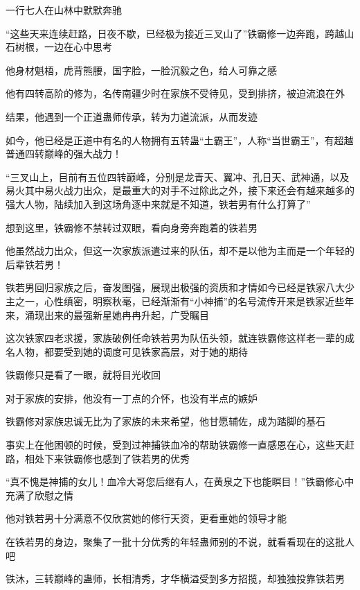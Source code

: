 
\begin{this_body}



一行七人在山林中默默奔驰

“这些天来连续赶路，日夜不歇，已经极为接近三叉山了”铁霸修一边奔跑，跨越山石树根，一边在心中思考

他身材魁梧，虎背熊腰，国字脸，一脸沉毅之色，给人可靠之感

他有四转高阶的修为，名传南疆少时在家族不受待见，受到排挤，被迫流浪在外

结果，他遇到一个正道蛊师传承，转为力道流派，从而发迹

如今，他已经是正道中有名的人物拥有五转蛊“土霸王”，人称“当世霸王”，有超越普通四转巅峰的强大战力！

“三叉山上，目前有五位四转巅峰，分别是龙青天、翼冲、孔日天、武神通，以及易火其中易火战力出众，是最重大的对手不过除此之外，接下来还会有越来越多的强大人物，陆续加入到这场角逐中来就是不知道，铁若男有什么打算了”

想到这里，铁霸修不禁转过双眼，看向身旁奔跑着的铁若男

他虽然战力出众，但这一次家族派遣过来的队伍，却不是以他为主而是一个年轻的后辈铁若男！

铁若男回归家族之后，奋发图强，展现出极强的资质和才情如今已经是铁家八大少主之一，心性缜密，明察秋毫，已经渐渐有“小神捕”的名号流传开来是铁家近些年来，涌现出来的最强新星她冉冉升起，广受瞩目

这次铁家四老求援，家族破例任命铁若男为队伍头领，就连铁霸修这样老一辈的成名人物，都要受到她的调度可见铁家高层，对于她的期待

铁霸修只是看了一眼，就将目光收回

对于家族的安排，他没有一丁点的介怀，也没有半点的嫉妒

铁霸修对家族忠诚无比为了家族的未来希望，他甘愿辅佐，成为踏脚的基石

事实上在他困顿的时候，受到过神捕铁血冷的帮助铁霸修一直感恩在心，这些天赶路，相处下来铁霸修也感到了铁若男的优秀

“真不愧是神捕的女儿！血冷大哥您后继有人，在黄泉之下也能瞑目！”铁霸修心中充满了欣慰之情

他对铁若男十分满意不仅欣赏她的修行天资，更看重她的领导才能

在铁若男的身边，聚集了一批十分优秀的年轻蛊师别的不说，就看看现在的这批人吧

铁沐，三转巅峰的蛊师，长相清秀，才华横溢受到多方招揽，却独独投靠铁若男


\end{this_body}
